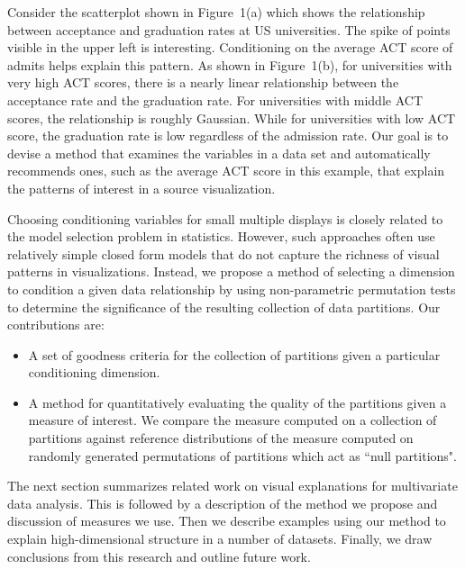 Consider the scatterplot shown in Figure~1(a) which shows the relationship between acceptance and graduation rates at US universities. The spike of points visible in the upper left is interesting. Conditioning on the average ACT score of admits helps explain this pattern. As shown in Figure~1(b), for universities with very high ACT scores, there is a nearly linear relationship between the acceptance rate and the graduation rate. For universities with middle ACT scores, the relationship is roughly Gaussian. While for universities with low ACT score, the graduation rate is low regardless of the admission rate. Our goal is to devise a method that examines the variables in a data set and automatically recommends ones, such as the average ACT score in this example, that explain the patterns of interest in a source visualization.

Choosing conditioning variables for small multiple displays is closely related to the model selection problem in statistics. However, such approaches often use relatively simple closed form models that do not capture the richness of visual patterns in visualizations. Instead, we propose a method of selecting a dimension to condition a given data relationship by using non-parametric permutation tests to determine the significance of the resulting collection of data partitions. Our contributions are:
\begin{itemize}
    \item A set of goodness criteria for the collection of partitions given a particular conditioning dimension.
    \item A method for quantitatively evaluating the quality of the partitions given a measure of interest. We compare the measure computed on a collection of partitions against reference distributions of the measure computed on randomly generated permutations of partitions which act as ``null partitions". 
\end{itemize}

The next section summarizes related work on visual explanations for multivariate data analysis. This is followed by a description of the method we propose and discussion of measures we use. Then we describe examples using our method to explain high-dimensional structure in a number of datasets. Finally, we draw conclusions from this research and outline future work.

